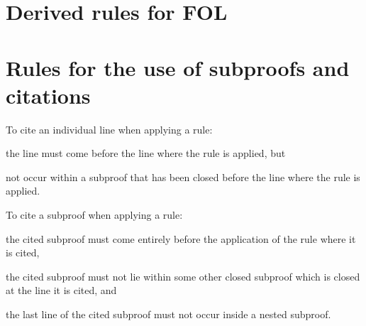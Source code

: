 \section{Derived rules for FOL}

\begin{multicols}{2}
\begin{fitchproof}
\end{fitchproof}
\begin{fitchproof}
\end{fitchproof}
\begin{fitchproof}
\end{fitchproof}
\begin{fitchproof}
\end{fitchproof}
\end{multicols}

\section{Rules for the use of subproofs and citations}

To cite an individual line when applying a rule:
\begin{compactlist}
\item the line must come before the line where the rule is applied, but 
\item not occur within a subproof that has been closed before the line where the rule is applied.
\end{compactlist}
To cite a subproof when applying a rule:
\begin{compactlist} 
\item the cited subproof must come entirely before the application of the rule where it is cited,
\item the cited subproof must not lie within some other closed subproof which is closed at the line it is cited, and 
\item the last line of the cited subproof must not occur inside a nested subproof.
\end{compactlist}

